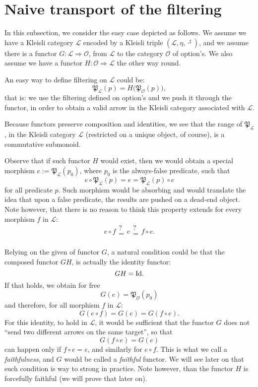 \documentclass[12pt,a4paper]{report}
\theoremstyle{theorem}
\theoremstyle{definition}
\begin{document}
\section{Naive transport of the filtering}

In this subsection, we consider the easy case depicted as follows.
We assume we have a Kleisli category $\mathscr{L}$
encoded by a Kleisli triple
$(\mathcal{L},\eta,\cdot^\sharp)$, and we assume there is a functor
$G : \mathscr{L}\Rightarrow\mathscr{O}$, from $\mathscr{L}$ to the
category $\mathscr{O}$ of option's. We also assume we have a functor
$H : \mathscr{O}\Rightarrow \mathscr{L}$ the other way round.

An easy way to define filtering on $\mathscr{L}$ could be:
	\[ \mathfrak{P}_\mathscr{L}(p)
		= H\big(\mathfrak{P}_\mathscr{O}(p)\big) ,\]
that is: we use the filtering defined on option's and we push it through
the functor, in order to obtain a valid arrow in the Kleisli category
associated with $\mathcal{L}$.

Because functors preserve composition and identities,
we see that the range of
$\mathfrak{P}_{\mathscr{L}}$, in the Kleisli category 
$\mathscr{L}$ (restricted on a unique object, of course), is a
commutative submonoid.

Observe that if such functor $H$ would exist, then we would obtain
a special morphism $e:=\mathfrak{P}_\mathscr{L}(p_0)$, where $p_0$
is the always-false predicate, such that
	\[ e\circ \mathfrak{P}_{\mathscr{L}}(p)
		= e = \mathfrak{P}_{\mathscr{L}}(p) \circ e \]
for all predicate $p$. Such morphism would be absorbing and would
translate the idea that upon a false predicate, the results are
pushed on a dead-end object. Note however, that there is no reason
to think this property extends for every morphism $f$ in $\mathscr{L}$:
	\[ e\circ f \mathrel{\substack{?\\=\\~}} e
		\mathrel{\substack{?\\=\\~}} f\circ e .\]

Relying on the given of functor $G$, a natural condition could be that the
composed functor $GH$, is actually the identity functor:
	\[ GH = {\rm Id} .\]
If that holds,
we obtain for free
	\[ G(e) = \mathfrak{P}_{\mathscr{O}}(p_0) \]
and therefore, for all morphism $f$ in $\mathscr{L}$:
	\[ G(e\circ f) = G(e) = G(f\circ e) .\]
For this identity, to hold in $\mathscr{L}$, it would be sufficient that
the functor $G$ does not ``send two different arrows on the same target'',
so that
	\[ G(f\circ e) = G(e) \]
can happen only if $f\circ e=e$, and similarly for $e\circ f$.
This is what we call a \emph{faithfulness}, and $G$ would be
called a \emph{faithful} functor. We will see later on that such condition
is way to strong in practice. Note however, than the functor $H$
is forcefully faithful (we will prove that later on).
\end{document}
